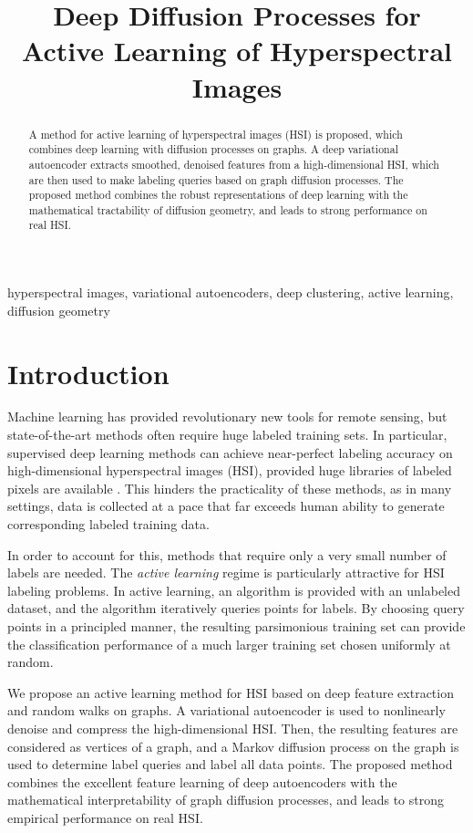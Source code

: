 \documentclass{article}
\title{Deep Diffusion Processes for Active Learning of Hyperspectral Images}
\begin{document}
\maketitle

\begin{abstract} A method for active learning of hyperspectral images (HSI) is proposed, which combines deep learning with diffusion processes on graphs.  A deep variational autoencoder extracts smoothed, denoised features from a high-dimensional HSI, which are then used to make labeling queries based on graph diffusion processes.  The proposed method combines the robust representations of deep learning with the mathematical tractability of diffusion geometry, and leads to strong performance on real HSI.  

\end{abstract}

\begin{keywords}hyperspectral images, variational autoencoders, deep clustering, active learning, diffusion geometry\end{keywords}

\section{Introduction}
\label{sec:Introduction}
 
 Machine learning has provided revolutionary new tools for remote sensing, but state-of-the-art methods often require huge labeled training sets.  In particular, supervised deep learning methods can achieve near-perfect labeling accuracy on high-dimensional hyperspectral images (HSI), provided huge libraries of labeled pixels are available \cite{Zhu2017_Deep}.  This hinders the practicality of these methods, as in many settings, data is collected at a pace that far exceeds human ability to generate corresponding labeled training data.
 
 In order to account for this, methods that require only a very small number of labels are needed.  The \emph{active learning} regime is particularly attractive for HSI labeling problems.  In active learning, an algorithm is provided with an unlabeled dataset, and the algorithm iteratively queries points for labels.  By choosing query points in a principled manner, the resulting parsimonious training set can provide the classification performance of a much larger training set chosen uniformly at random.  
 
 We propose an active learning method for HSI based on deep feature extraction and random walks on graphs.  A variational autoencoder is used to nonlinearly denoise and compress the high-dimensional HSI.  Then, the resulting features are considered as vertices of a graph, and a Markov diffusion process on the graph is used to determine label queries and label all data points.  The proposed method combines the excellent feature learning of deep autoencoders with the mathematical interpretability of graph diffusion processes, and leads to strong empirical performance on real HSI.  
\end{document}
